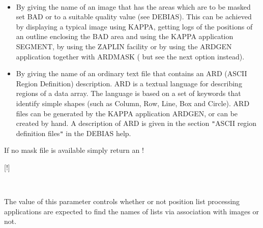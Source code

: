 \documentclass[twoside,11pt]{article}
\newcommand{\htmlref}[2]{#1}
\newcommand{\xref}[3]{#1}
\renewcommand{\_}{\texttt{\symbol{95}}}
\newcommand{\qt}[1]{{\tt "}#1{\tt "}}
\newcommand{\xroutine}[1]{\htmlref{{\sc #1}}{#1}}
\newcommand{\sstsubsection}[1]{ \item[{#1}] \mbox{} \\}
\newcommand{\sstitemlist}[1]{
  \mbox{} \\
  \vspace{-3.5ex}
  \begin{itemize}
     #1
  \end{itemize}
}
\newcommand{\sstitem}{\item}
\newcommand{\sstsubsection}[1]{\item[{#1}]}
\newcommand{\sstitemlist}[1]{
      \begin{itemize}
         #1
      \end{itemize}
      \\
   }
\newcommand{\sstitem}{\item}
\begin{document}
{{{         \sstitemlist{

            \sstitem
              By giving the name of an image that has the areas which are
                to be masked set BAD or to a suitable quality value
                (see \xroutine{DEBIAS}). This can be achieved by displaying a typical
                image using KAPPA, getting logs of the positions of an outline
                enclosing the BAD area and using the KAPPA application
                \xref{SEGMENT}{sun95}{SEGMENT}, by using the
                \xref{ZAPLIN}{sun95}{ZAPLIN}
                facility or by using the \xref{ARDGEN}{sun95}{ARDGEN}
                application together with \xref{ARDMASK}{sun95}{ARDMASK} (
                but see the next option instead).

            \sstitem
              By giving the name of an ordinary text file that contains an
                ARD (ASCII Region Definition) description. ARD is a textual
                language for describing regions of a data array. The
                language is based on a set of keywords that identify simple
                shapes (such as Column, Row, Line, Box and Circle).  ARD
                files can be generated by the KAPPA application
                \xref{ARDGEN}{sun95}{}, or
                can be created by hand. A description of ARD is given in
                the section \qt{ASCII region definition files} in the
                \xroutine{DEBIAS} help.

         }
         If no mask file is available simply return an !

         [!]
      }
      \sstsubsection{
         NDFNAMES = \_LOGICAL (Read and Write)
      } {
         The value of this parameter controls whether or not position
         list processing applications are expected to find the names of
         lists via association with images or not.

}}}
\end{document}
